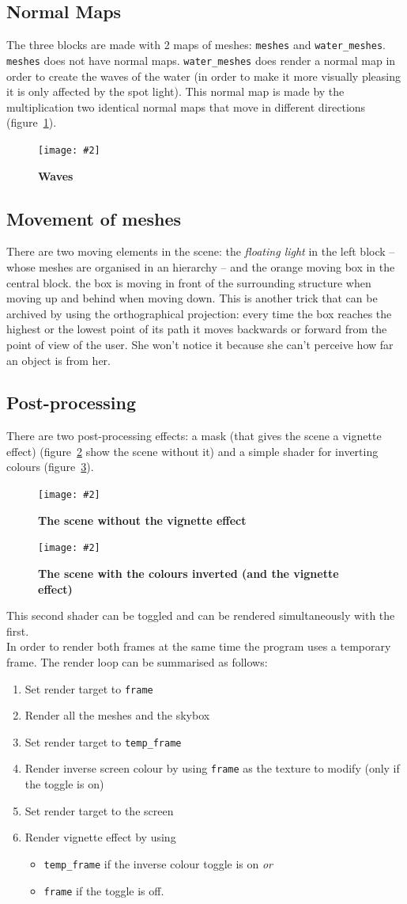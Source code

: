 \documentclass[10pt, a4paper]{article}
\newcommand{\figuremacro}[5]{
    \begin{figure}[#1]
        \centering
        \texttt{[image: \#2]}
        \caption[#3]{\textbf{#3}#4}
        \label{fig:#2}
    \end{figure}
}
\begin{document}
\subsection{Normal Maps}
The three blocks are made with 2 maps of meshes: \texttt{meshes} and \texttt{water\_meshes}. \texttt{meshes} does not have normal maps. \texttt{water\_meshes} does render a normal map in order to create the waves of the water (in order to make it more visually pleasing it is only affected by the spot light). This normal map is made by the multiplication two identical normal maps that move in different directions (figure~\ref{fig:Capture04}).
\figuremacro{h}{Capture04}{Waves}{}{1.0}

\subsection{Movement of meshes}
There are two moving elements in the scene: the \textit{floating light} in the left block -- whose meshes are organised in an hierarchy -- and the orange moving box in the central block.
the box is moving in front of the surrounding structure when moving up and behind when moving down. This is another trick that can be archived by using the orthographical projection: every time the box reaches the highest or the lowest point of its path it moves backwards or forward from the point of view of the user. She won't notice it because she can't perceive how far an object is from her.

\subsection{Post-processing}
There are two post-processing effects: a mask (that gives the scene a vignette effect) (figure~\ref{fig:Capture07} show the scene without it) and a simple shader for inverting colours (figure~\ref{fig:Capture02}).
\figuremacro{h}{Capture07}{The scene without the vignette effect}{}{1.0}
\figuremacro{h}{Capture02}{The scene with the colours inverted (and the vignette effect)}{}{1.0}
This second shader can be toggled and can be rendered simultaneously with the first.\\
In order to render both frames at the same time the program uses a temporary frame. The render loop can be summarised as follows:
\begin{enumerate}
	\item Set render target to \texttt{frame}
	\item Render all the meshes and the skybox
	\item Set render target to \texttt{temp\_frame}
	\item Render inverse screen colour by using \texttt{frame} as the texture to modify (only if the toggle is on)
	\item Set render target to the screen
	\item Render vignette effect by using
	\begin{itemize}
		\item \texttt{temp\_frame} if the inverse colour toggle is on \textit{or}
		\item \texttt{frame} if the toggle is off.
	\end{itemize}
\end{enumerate}
\end{document}

